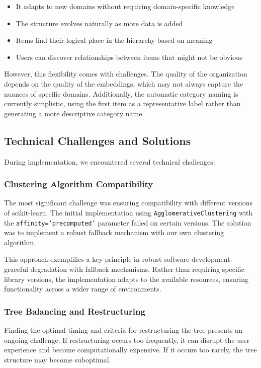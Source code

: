 \documentclass[conference]{IEEEtran}
\begin{document}
\begin{itemize}
    \item It adapts to new domains without requiring domain-specific knowledge
    \item The structure evolves naturally as more data is added
    \item Items find their logical place in the hierarchy based on meaning
    \item Users can discover relationships between items that might not be obvious
\end{itemize}

However, this flexibility comes with challenges. The quality of the organization depends on the quality of the embeddings, which may not always capture the nuances of specific domains. Additionally, the automatic category naming is currently simplistic, using the first item as a representative label rather than generating a more descriptive category name.

\subsection{Technical Challenges and Solutions}

During implementation, we encountered several technical challenges:

\subsubsection{Clustering Algorithm Compatibility}

The most significant challenge was ensuring compatibility with different versions of scikit-learn. The initial implementation using \texttt{AgglomerativeClustering} with the \texttt{affinity='precomputed'} parameter failed on certain versions. The solution was to implement a robust fallback mechanism with our own clustering algorithm.

This approach exemplifies a key principle in robust software development: graceful degradation with fallback mechanisms. Rather than requiring specific library versions, the implementation adapts to the available resources, ensuring functionality across a wider range of environments.

\subsubsection{Tree Balancing and Restructuring}

Finding the optimal timing and criteria for restructuring the tree presents an ongoing challenge. If restructuring occurs too frequently, it can disrupt the user experience and become computationally expensive. If it occurs too rarely, the tree structure may become suboptimal.
\end{document}
